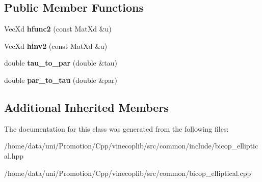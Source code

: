 \subsection*{Public Member Functions}
\begin{DoxyCompactItemize}
\item 
\hypertarget{class_elliptical_bicop_a153ebc513b4ce3c829f7e7bcf3e7fd8a}{Vec\+Xd {\bfseries hfunc2} (const Mat\+Xd \&u)}\label{class_elliptical_bicop_a153ebc513b4ce3c829f7e7bcf3e7fd8a}

\item 
\hypertarget{class_elliptical_bicop_a8636d5c8a2428a0ce915f284198d92b4}{Vec\+Xd {\bfseries hinv2} (const Mat\+Xd \&u)}\label{class_elliptical_bicop_a8636d5c8a2428a0ce915f284198d92b4}

\item 
\hypertarget{class_elliptical_bicop_a0d740bb8e0c44ded81d374e598095e6e}{double {\bfseries tau\+\_\+to\+\_\+par} (double \&tau)}\label{class_elliptical_bicop_a0d740bb8e0c44ded81d374e598095e6e}

\item 
\hypertarget{class_elliptical_bicop_a248e43a833c58c45c0e860d7b724a0db}{double {\bfseries par\+\_\+to\+\_\+tau} (double \&par)}\label{class_elliptical_bicop_a248e43a833c58c45c0e860d7b724a0db}

\end{DoxyCompactItemize}
\subsection*{Additional Inherited Members}


The documentation for this class was generated from the following files\+:\begin{DoxyCompactItemize}
\item 
/home/data/uni/\+Promotion/\+Cpp/vinecoplib/src/common/include/bicop\+\_\+elliptical.\+hpp\item 
/home/data/uni/\+Promotion/\+Cpp/vinecoplib/src/common/bicop\+\_\+elliptical.\+cpp\end{DoxyCompactItemize}
